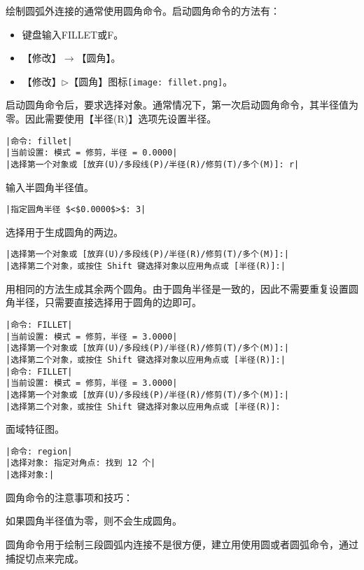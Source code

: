 \begin{procedure}
绘制圆弧外连接的通常使用圆角命令。启动圆角命令的方法有：
\begin{itemize}
\item 键盘输入FILLET或F。
\item 【修改】$\rightarrow$【圆角】。
\item 【修改】$\triangleright$【圆角】图标\texttt{[image: fillet.png]}。
\end{itemize}
启动圆角命令后，要求选择对象。通常情况下，第一次启动圆角命令，其半径值为零。因此需要使用【半径(R)】选项先设置半径。
\begin{lstlisting}
|命令: fillet|
|当前设置: 模式 = 修剪，半径 = 0.0000|
|选择第一个对象或 [放弃(U)/多段线(P)/半径(R)/修剪(T)/多个(M)]: r| 
\end{lstlisting}
输入半圆角半径值。
\begin{lstlisting}
|指定圆角半径 $<$0.0000$>$: 3|
\end{lstlisting}
选择用于生成圆角的两边。
\begin{lstlisting}
|选择第一个对象或 [放弃(U)/多段线(P)/半径(R)/修剪(T)/多个(M)]:|
|选择第二个对象，或按住 Shift 键选择对象以应用角点或 [半径(R)]:|
\end{lstlisting}
用相同的方法生成其余两个圆角。由于圆角半径是一致的，因此不需要重复设置圆角半径，只需要直接选择用于圆角的边即可。
\begin{lstlisting}
|命令: FILLET|
|当前设置: 模式 = 修剪，半径 = 3.0000|
|选择第一个对象或 [放弃(U)/多段线(P)/半径(R)/修剪(T)/多个(M)]:|
|选择第二个对象，或按住 Shift 键选择对象以应用角点或 [半径(R)]:|
|命令: FILLET|
|当前设置: 模式 = 修剪，半径 = 3.0000|
|选择第一个对象或 [放弃(U)/多段线(P)/半径(R)/修剪(T)/多个(M)]:|
|选择第二个对象，或按住 Shift 键选择对象以应用角点或 [半径(R)]:
\end{lstlisting}
\item 面域特征图。
\begin{lstlisting}
|命令: region|
|选择对象: 指定对角点: 找到 12 个|
|选择对象:|
\end{lstlisting}
\end{procedure}
圆角命令的注意事项和技巧：
\begin{tips}
\item 如果圆角半径值为零，则不会生成圆角。
\item 圆角命令用于绘制三段圆弧内连接不是很方便，建立用使用圆或者圆弧命令，通过捕捉切点来完成。
\end{tips}
